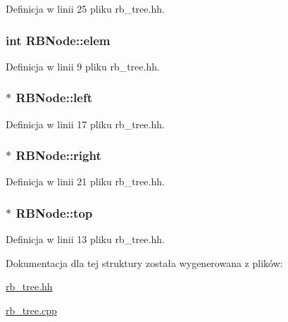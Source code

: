 Definicja w linii 25 pliku rb\-\_\-tree.\-hh.

\hypertarget{struct_r_b_node_a5c76fd9ee8fa04e10e59509852d91bb5}{
\subsubsection[{elem}]{\setlength{\rightskip}{0pt plus 5cm}int R\-B\-Node\-::elem}}\label{struct_r_b_node_a5c76fd9ee8fa04e10e59509852d91bb5}


Definicja w linii 9 pliku rb\-\_\-tree.\-hh.

\hypertarget{struct_r_b_node_a3345545f8a1678010bca11b5f7153a4a}{
\subsubsection[{left}]{$\ast$ R\-B\-Node\-::left}}\label{struct_r_b_node_a3345545f8a1678010bca11b5f7153a4a}


Definicja w linii 17 pliku rb\-\_\-tree.\-hh.

\hypertarget{struct_r_b_node_af82826872827c548a5713eb84f264767}{
\subsubsection[{right}]{$\ast$ R\-B\-Node\-::right}}\label{struct_r_b_node_af82826872827c548a5713eb84f264767}


Definicja w linii 21 pliku rb\-\_\-tree.\-hh.

\hypertarget{struct_r_b_node_ae027bf4a39cb48c3b94ac806b3c6e74d}{
\subsubsection[{top}]{$\ast$ R\-B\-Node\-::top}}\label{struct_r_b_node_ae027bf4a39cb48c3b94ac806b3c6e74d}


Definicja w linii 13 pliku rb\-\_\-tree.\-hh.



Dokumentacja dla tej struktury została wygenerowana z plików\-:\begin{DoxyCompactItemize}
\item 
\hyperlink{rb__tree_8hh}{rb\-\_\-tree.\-hh}\item 
\hyperlink{rb__tree_8cpp}{rb\-\_\-tree.\-cpp}\end{DoxyCompactItemize}
